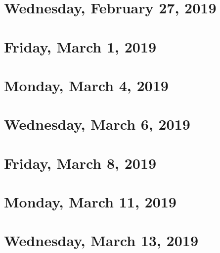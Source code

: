 \documentclass[reqno]{amsart}
\begin{document}
\section{Wednesday, February 27, 2019}
    

\section{Friday, March 1, 2019}
    

\section{Monday, March 4, 2019}
    

\section{Wednesday, March 6, 2019}
    

\section{Friday, March 8, 2019}
    

\section{Monday, March 11, 2019}
    
    
\section{Wednesday, March 13, 2019}
    
\end{document}
